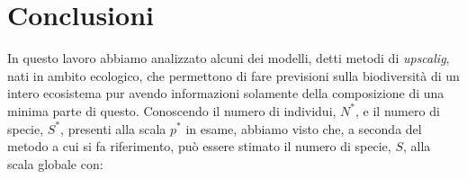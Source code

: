\chapter{Conclusioni}




%
%
%
%

In questo lavoro abbiamo analizzato alcuni dei modelli, detti metodi di \emph{upscalig}, nati in ambito ecologico, che permettono di fare previsioni sulla biodiversità di un intero ecosistema pur avendo informazioni solamente della composizione  di una minima parte di questo. Conoscendo il numero di individui, $N^*$, e il numero di specie, $S^*$, presenti alla scala $p^*$ in esame, abbiamo visto che, a seconda del metodo a cui si fa riferimento, può essere stimato il numero di specie, $S$, alla scala globale con:

